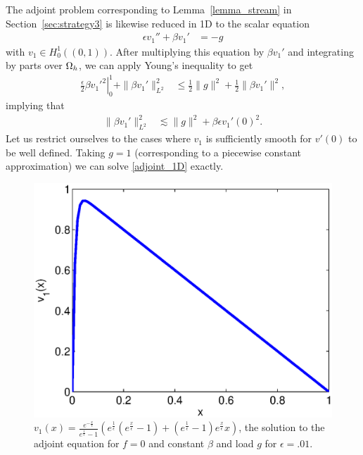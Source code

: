 The adjoint problem corresponding to Lemma~\ref{lemma_stream} in Section~\ref{sec:strategy3} is likewise reduced in 1D to the scalar equation
\begin{align}
\epsilon v_1'' + \beta v_1' &= -g \label{adjoint_1D}
\end{align}
with $v_1\in H^1_0\left((0,1)\right)$.  After multiplying this equation by $\beta v_1'$ and integrating by parts over $\Oh$, we can apply Young's inequality to get
\begin{align*}
\left.\frac{\epsilon}{2} \beta v_1'^2\right|_0^1 + \|\beta v_1'\|_{L^2}^2 &\leq \frac{1}{2}\|g\|^2 + \frac{1}{2}\|\beta v_1'\|^2,
\end{align*}
implying that
\begin{align*}
\|\beta v_1'\|_{L^2}^2 & \lesssim \|g\|^2 + {\beta \epsilon} v_1'(0)^2.
\end{align*}
Let us restrict ourselves to the cases where $v_1$ is sufficiently smooth for $v'(0)$ to be well defined.  Taking $g=1$ (corresponding to a piecewise constant approximation) we can solve \eqref{adjoint_1D} exactly. 
\begin{figure}
\centering
\includegraphics[scale=.65]{figs/testBoundary1D.eps}
\caption{$v_1(x) = \frac{e^{-\frac{x}{\epsilon}}}{e^{\frac{1}{\epsilon}}-1}\left(e^{\frac{1}{\epsilon}}\left(e^{\frac{x}{\epsilon}}-1\right) + \left(e^{\frac{1}{\epsilon}}-1\right)e^{\frac{x}{\epsilon}}x\right)$, the solution to the adjoint equation for $f=0$ and constant $\beta$ and load $g$ for $\epsilon = .01$.}
\label{fig:testBoundary1D}
\end{figure}

